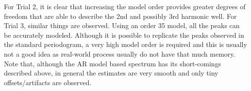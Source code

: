 \noindent{}For Trial 2, it is clear that increasing the model order provides greater degrees of freedom that are able to describe the 2nd and possibly 3rd harmonic well. For Trial 3, similar things are observed. Using an order 35 model, all the peaks can be accurately modeled. Although it is possible to replicate the peaks observed in the standard periodogram, a very high model order is required and this is usually not a good idea as real-world process usually do not have that much memory.\\

\noindent{}Note that, although the AR model based spectrum has its short-comings described above, in general the estimates are very smooth and only tiny offsets/artifacts are observed.

